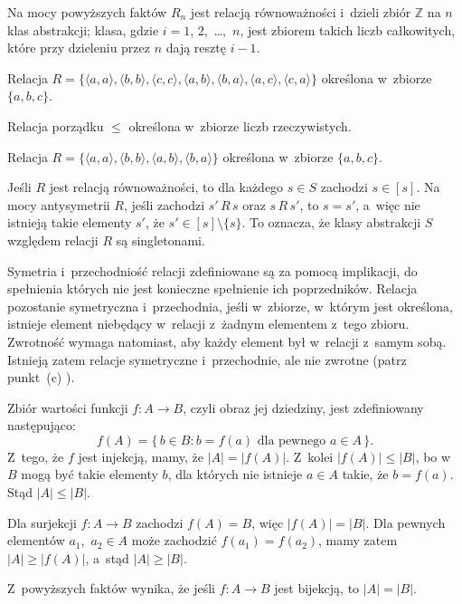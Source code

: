 Na mocy powyższych faktów $R_n$ jest relacją równoważności i~dzieli zbiór $\mathbb{Z}$ na $n$ klas abstrakcji;  klasa, gdzie $i=1$, 2,~\dots,~$n$, jest zbiorem takich liczb całkowitych, które przy dzieleniu przez $n$ dają resztę $i-1$.

\exercise %
\subexercise
Relacja $R=\bigl\{\langle a,a\rangle,\langle b,b\rangle,\langle c,c\rangle,\langle a,b\rangle,\langle b,a\rangle,\langle a,c\rangle,\langle c,a\rangle\bigr\}$ określona w~zbiorze $\{a,b,c\}$.

\subexercise
Relacja porządku $\le$ określona w~zbiorze liczb rzeczywistych.

\subexercise
Relacja $R=\bigl\{\langle a,a\rangle,\langle b,b\rangle,\langle a,b\rangle,\langle b,a\rangle\bigr\}$ określona w~zbiorze $\{a,b,c\}$.

\exercise %
Jeśli $R$ jest relacją równoważności, to dla każdego $s\in S$ zachodzi $s\in[s]$. Na mocy antysymetrii $R$, jeśli zachodzi $s'\,R\,s$ oraz $s\,R\,s'$, to $s=s'$, a~więc nie istnieją takie elementy $s'$, że $s'\in[s]\setminus\{s\}$. To oznacza, że klasy abstrakcji $S$ względem relacji $R$ są singletonami.

\exercise %
Symetria i~przechodniość relacji zdefiniowane są za pomocą implikacji, do spełnienia których nie jest konieczne spełnienie ich poprzedników. Relacja pozostanie symetryczna i~przechodnia, jeśli w~zbiorze, w~którym jest określona, istnieje element niebędący w~relacji z~żadnym elementem z~tego zbioru. Zwrotność wymaga natomiast, aby każdy element był w~relacji z~samym sobą. Istnieją zatem relacje symetryczne i~przechodnie, ale nie zwrotne (patrz punkt~(c) ).


\exercise %
\subexercise
Zbiór wartości funkcji $f\colon A\to B$, czyli obraz jej dziedziny, jest zdefiniowany następująco:
\[
	f(A) = \bigl\{\,b\in B:b=f(a)\text{ dla pewnego $a\in A$}\,\bigr\}.
\]
Z~tego, że $f$ jest injekcją, mamy, że $|A|=|f(A)|$. Z~kolei $|f(A)|\le|B|$, bo w~$B$ mogą być takie elementy $b$, dla których nie istnieje $a\in A$ takie, że $b=f(a)$. Stąd $|A|\le|B|$.

\subexercise
Dla surjekcji $f\colon A\to B$ zachodzi $f(A)=B$, więc $|f(A)|=|B|$. Dla pewnych elementów $a_1$,~$a_2\in A$ może zachodzić $f(a_1)=f(a_2)$, mamy zatem $|A|\ge|f(A)|$, a~stąd $|A|\ge|B|$.
\bigskip

\noindent Z~powyższych faktów wynika, że jeśli $f\colon A\to B$ jest bijekcją, to $|A|=|B|$.


